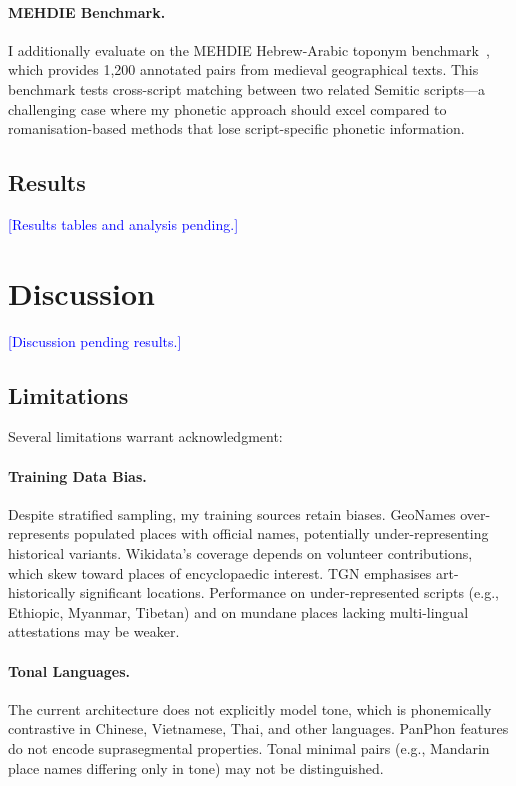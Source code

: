 \documentclass[11pt,a4paper]{article}
\newcommand{\placeholder}[1]{\textcolor{blue}{[#1]}}
\begin{document}
\paragraph{MEHDIE Benchmark.} I additionally evaluate on the MEHDIE Hebrew-Arabic toponym benchmark~\citep{mehdie2025}, which provides 1,200 annotated pairs from medieval geographical texts. This benchmark tests cross-script matching between two related Semitic scripts---a challenging case where my phonetic approach should excel compared to romanisation-based methods that lose script-specific phonetic information.

\subsection{Results}

\placeholder{Results tables and analysis pending.}


\section{Discussion}
\label{sec:discussion}

\placeholder{Discussion pending results.}

\subsection{Limitations}

Several limitations warrant acknowledgment:

\paragraph{Training Data Bias.} Despite stratified sampling, my training sources retain biases. GeoNames over-represents populated places with official names, potentially under-representing historical variants. Wikidata's coverage depends on volunteer contributions, which skew toward places of encyclopaedic interest. TGN emphasises art-historically significant locations. Performance on under-represented scripts (e.g., Ethiopic, Myanmar, Tibetan) and on mundane places lacking multi-lingual attestations may be weaker.

\paragraph{Tonal Languages.} The current architecture does not explicitly model tone, which is phonemically contrastive in Chinese, Vietnamese, Thai, and other languages. PanPhon features do not encode suprasegmental properties. Tonal minimal pairs (e.g., Mandarin place names differing only in tone) may not be distinguished.
\end{document}
